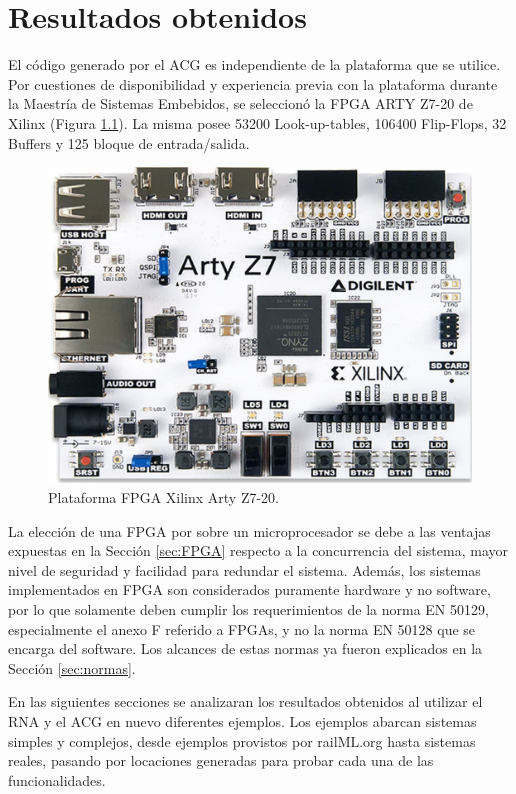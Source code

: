 \chapter{Resultados obtenidos}
	\label{sec:resultados}
	
	El código generado por el ACG es independiente de la plataforma que se utilice. Por cuestiones de disponibilidad y experiencia previa con la plataforma durante la Maestría de Sistemas Embebidos, se seleccionó la FPGA ARTY Z7-20 de Xilinx (Figura \ref{fig:FPGA}). La misma posee 53200 Look-up-tables, 106400 Flip-Flops, 32 Buffers y 125 bloque de entrada/salida.	
	
\begin{figure}[H]
	\centering
	\includegraphics[width=1\textwidth]{Figuras/FPGA}
	\centering\caption{Plataforma FPGA Xilinx Arty Z7-20.}
	\label{fig:FPGA}
\end{figure}

	La elección de una FPGA por sobre un microprocesador se debe a las ventajas expuestas en la Sección \ref{sec:FPGA} respecto a la concurrencia del sistema, mayor nivel de seguridad y facilidad para redundar el sistema. Además, los sistemas implementados en FPGA son considerados puramente hardware y no software, por lo que solamente deben cumplir los requerimientos de la norma EN 50129, especialmente el anexo F referido a FPGAs, y no la norma EN 50128 que se encarga del software. Los alcances de estas normas ya fueron explicados en la Sección \ref{sec:normas}.

	En las siguientes secciones se analizaran los resultados obtenidos al utilizar el RNA y el ACG en nuevo diferentes ejemplos. Los ejemplos abarcan sistemas simples y complejos, desde ejemplos provistos por railML.org hasta sistemas reales, pasando por locaciones generadas para probar cada una de las funcionalidades. 
	
